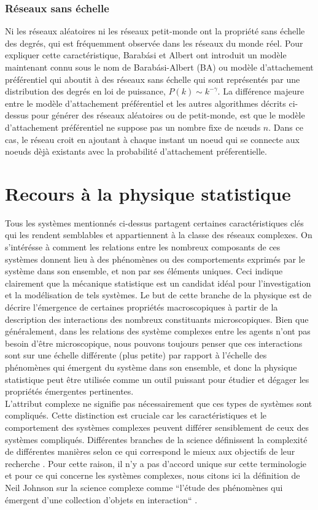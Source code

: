 \subsubsection{Réseaux sans échelle}
Ni les réseaux aléatoires ni les réseaux petit-monde ont la propriété sans échelle des degrés, qui est fréquemment
observée dans les réseaux du monde réel. Pour expliquer cette caractéristique, Barab\'{a}si et Albert ont introduit 
un modèle maintenant connu sous le nom de Barab\'{a}si-Albert (BA) \cite{BA1999} ou modèle d'attachement préférentiel
qui aboutit à des réseaux sans échelle qui sont représentés par une distribution des degrés en loi de puissance, 
$P(k)\sim k^{-\gamma}$. La différence majeure entre le modèle d'attachement préférentiel et les autres algorithmes 
décrits ci-dessus pour générer des réseaux aléatoires ou de petit-monde, est que le modèle d'attachement préférentiel
ne suppose pas un nombre fixe de nœuds $n$. Dans ce cas, le réseau croit en ajoutant à chaque instant un noeud qui se connecte aux noeuds dèjà existants avec la probabilité d'attachement préferentielle.

\section{Recours à la physique statistique}
Tous les systèmes mentionnés ci-dessus partagent certaines caractéristiques clés qui les rendent semblables
et appartiennent à la classe des réseaux complexes. On s'intérésse à  comment les 
relations entre les nombreux composants de ces systèmes donnent lieu à des phénomènes ou des comportements 
exprimés par le système dans son ensemble, et non par ses éléments uniques. Ceci indique clairement que
la mécanique statistique est un candidat idéal pour l'investigation et la modélisation de tels systèmes. 
Le but de cette branche de la physique est de décrire l'émergence de certaines propriétés macroscopiques
à partir de la description des interactions des nombreux constituants microscopiques. 
Bien que généralement, dans  les relations des système complexes entre les agents
n'ont pas besoin d'être microscopique, nous pouvons toujours penser que ces interactions sont sur une échelle 
différente (plus petite) par rapport à l'échelle des phénomènes qui émergent du système dans son ensemble, et donc 
la physique statistique peut être utilisée comme un outil puissant pour étudier et dégager les propriétés émergentes 
pertinentes.\\
L'attribut complexe ne signifie pas nécessairement que ces types de systèmes sont compliqués. Cette distinction est
cruciale car les caractéristiques et le comportement des systèmes complexes peuvent différer sensiblement de ceux des 
systèmes compliqués. Différentes branches de la science définissent la complexité de différentes manières selon ce
qui correspond le mieux aux objectifs de leur recherche \cite{NR1998,MMW1993,RG1996,MMAM2009}. Pour cette raison, il n'y a pas d'accord unique sur
cette terminologie et pour ce qui concerne les systèmes complexes, nous citons ici la définition de Neil Johnson sur 
la science complexe comme ``l'étude des phénomènes qui émergent d'une collection d'objets en interaction`` \cite{NFJ2007}.

\let\cleardoublepage\clearpage

